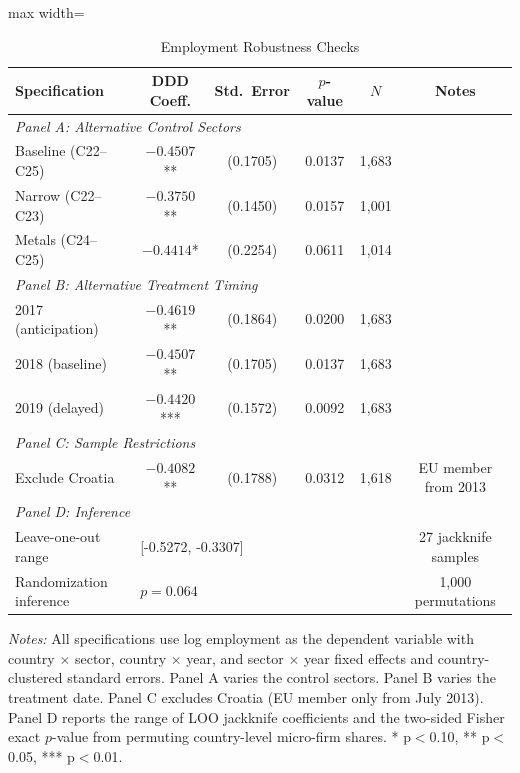 \begin{table}[H]
\centering
\caption{Employment Robustness Checks}
\label{tab:emp_robust}
\begin{adjustbox}{max width=\textwidth}
\begin{tabular}{lccccc}
\toprule
Specification & DDD Coeff. & Std.\ Error & $p$-value & $N$ & Notes \\
\midrule
\multicolumn{6}{l}{\textit{Panel A: Alternative Control Sectors}} \\
Baseline (C22--C25) & $-0.4507$** & (0.1705) & 0.0137 & 1,683 & \\
Narrow (C22--C23) & $-0.3750$** & (0.1450) & 0.0157 & 1,001 & \\
Metals (C24--C25) & $-0.4414$* & (0.2254) & 0.0611 & 1,014 & \\
\midrule
\multicolumn{6}{l}{\textit{Panel B: Alternative Treatment Timing}} \\
2017 (anticipation) & $-0.4619$** & (0.1864) & 0.0200 & 1,683 & \\
2018 (baseline) & $-0.4507$** & (0.1705) & 0.0137 & 1,683 & \\
2019 (delayed) & $-0.4420$*** & (0.1572) & 0.0092 & 1,683 & \\
\midrule
\multicolumn{6}{l}{\textit{Panel C: Sample Restrictions}} \\
Exclude Croatia & $-0.4082$** & (0.1788) & 0.0312 & 1,618 & EU member from 2013 \\
\midrule
\multicolumn{6}{l}{\textit{Panel D: Inference}} \\
Leave-one-out range & \multicolumn{4}{l}{[-0.5272, -0.3307]} & 27 jackknife samples \\
Randomization inference & \multicolumn{4}{l}{$p = 0.064$} & 1,000 permutations \\
\bottomrule
\end{tabular}
\end{adjustbox}
\par\vspace{0.3em}
{\footnotesize \textit{Notes:} All specifications use log employment as the dependent variable with country $\times$ sector, country $\times$ year, and sector $\times$ year fixed effects and country-clustered standard errors. Panel A varies the control sectors. Panel B varies the treatment date. Panel C excludes Croatia (EU member only from July 2013). Panel D reports the range of LOO jackknife coefficients and the two-sided Fisher exact $p$-value from permuting country-level micro-firm shares. * p$<$0.10, ** p$<$0.05, *** p$<$0.01.}
\end{table}

